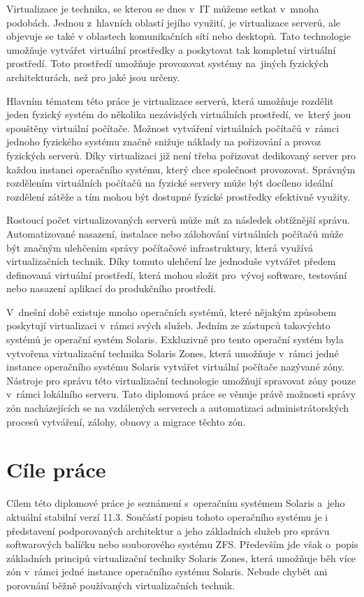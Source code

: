 \label{chapter:introduction}
Virtualizace je technika, se kterou se dnes v~IT můžeme setkat v~mnoha podobách. Jednou z~hlavních oblastí jejího využití,
je virtualizace serverů, ale objevuje se také v oblastech komunikačních sítí nebo desktopů. Tato technologie umožňuje vytvářet
virtuální prostředky a poskytovat tak kompletní virtuální prostředí. Toto prostředí umožňuje provozovat systémy na~jiných
fyzických architekturách, než pro jaké jsou určeny.

Hlavním tématem této práce je virtualizace serverů, která umožňuje rozdělit jeden fyzický systém do několika nezávislých virtuálních
prostředí, ve~který jsou spouštěny virtuální počítače. Možnost vytváření virtuálních počítačů v~rámci jednoho fyzického systému
značně snižuje náklady na pořizování a provoz fyzických serverů. Díky virtualizaci již není třeba pořizovat dedikovaný server pro
každou instanci operačního systému, který chce společnost provozovat. Správným rozdělením virtuálních počítačů na fyzické servery může být
docíleno ideální rozdělení zátěže a tím mohou být dostupné fyzické prostředky efektivně využity.

Rostoucí počet virtualizovaných serverů může mít za následek obtížnější správu. Automatizované nasazení, instalace nebo
zálohování virtuálních počítačů může být značným ulehčením správy počítačové infrastruktury, která využívá virtualizačních technik.
Díky tomuto ulehčení lze jednoduše vytvářet předem definovaná virtuální prostředí, která mohou složit pro~vývoj software, testování
nebo nasazení aplikací do produkčního prostředí. 

V~dnešní době existuje mnoho operačních systémů, které nějakým způsobem poskytují virtualizaci v~rámci svých služeb. Jedním ze zástupců
takovýchto systémů je operační systém Solaris. Exkluzivně pro tento operační systém byla vytvořena virtualizační technika Solaris
Zones, která umožňuje v~rámci jedné instance operačního systému Solaris vytvářet virtuální počítače nazývané zóny. Nástroje pro správu
této virtualizační technologie umožňují spravovat zóny pouze v~rámci lokálního serveru. Tato diplomová práce se věnuje právě možnosti
správy zón nacházejících se na vzdálených serverech a automatizaci administrátorských procesů vytváření, zálohy, obnovy a migrace 
těchto zón.
\section{Cíle práce}
\label{chapter:introduction:goals}
Cílem této diplomové práce je seznámení s~operačním systémem Solaris a~jeho aktuální stabilní verzí 11.3. Součástí popisu tohoto
operačního systému je i představení podporovaných architektur a jeho základních služeb pro správu softwarových balíčku nebo souborového
systému ZFS. Především jde však o~popis základních principů virtualizační techniky Solaris Zones, která umožňuje běh více zón v~rámci 
jedné instance operačního systému Solaris. Nebude chybět ani porovnání běžně používaných virtualizačních technik.

